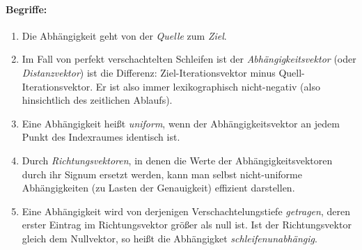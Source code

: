 \paragraph{Begriffe:}
\begin{enumerate}
\item Die Abhängigkeit geht von der \emph{Quelle} zum \emph{Ziel}.
\item Im Fall von perfekt verschachtelten Schleifen ist der
  \emph{Abhängigkeitsvektor} (oder \emph{Distanzvektor}) ist die Differenz: Ziel-Iterationsvektor minus
  Quell-Iterationsvektor. Er ist also immer lexikographisch nicht-negativ (also hinsichtlich des zeitlichen Ablaufs).
\item Eine Abhängigkeit heißt \emph{uniform}, wenn der Abhängigkeitsvektor an
  jedem Punkt des Indexraumes identisch ist.
\item Durch \emph{Richtungsvektoren}, in denen die Werte der
  Abhängigkeitsvektoren durch ihr Signum ersetzt werden, kann man selbst
  nicht-uniforme Abhängigkeiten (zu Lasten der Genauigkeit) effizient
  darstellen.
\item Eine Abhängigkeit wird von derjenigen Verschachtelungstiefe
  \emph{getragen}, deren erster Eintrag im Richtungsvektor größer als
  null ist. Ist der Richtungsvektor gleich dem Nullvektor, so heißt die
  Abhängigket \emph{schleifenunabhängig}.
\end{enumerate}
